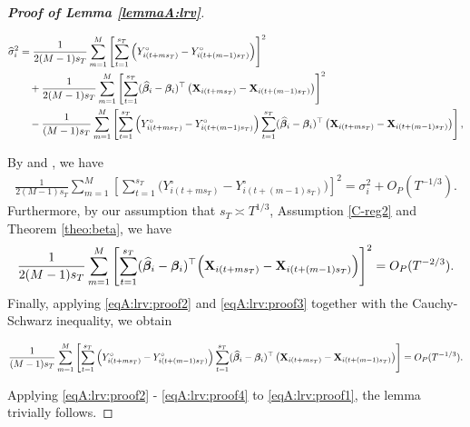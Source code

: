 \begin{proof}[\textnormal{\textbf{Proof of Lemma \ref{lemmaA:lrv}}}]
\begin{footnotesize}
\begin{align}\label{eqA:lrv:proof1}
\widehat{\sigma}_i^2  &= \frac{1}{2(M-1)s_T}\sum_{m=1}^M \left[\sum_{t = 1}^{s_T} \left(Y_{i(t + ms_T)}^\circ - Y_{i(t + (m-1)s_T)}^\circ\right)\right]^2 \nonumber\\
&\quad + \frac{1}{2(M-1)s_T}\sum_{m=1}^M \left[\sum_{t = 1}^{s_T} (\widehat{\bm{\beta}}_i - \bm{\beta}_i)^\top\left(\mathbf{X}_{i(t+ms_T)} - \mathbf{X}_{i(t+(m-1)s_T)}\right) \right]^2\\
 &\quad - \frac{1}{(M-1)s_T}\sum_{m=1}^M \left[\sum_{t = 1}^{s_T}  \left(Y_{i(t + ms_T)}^\circ - Y_{i(t + (m-1)s_T)}^\circ\right)\sum_{t = 1}^{s_T} (\widehat{\bm{\beta}}_i - \bm{\beta}_i)^\top\left(\mathbf{X}_{i(t+ms_T)} - \mathbf{X}_{i(t+(m-1)s_T)}\right) \right]\nonumber,
\end{align}
\end{footnotesize}
By \cite{Carlstein1986} and \cite{WuZhao2007}, we have
\begin{align}\label{eqA:lrv:proof2}
\frac{1}{2(M-1)s_T}\sum_{m=1}^M \left[\sum_{t = 1}^{s_T} \Big(Y_{i(t + ms_T)}^\circ - Y_{i(t + (m-1)s_T)}^\circ\Big)\right]^2  = \sigma_i^2 + O_P(T^{-1/3}).
\end{align}
Furthermore, by our assumption that $s_T \asymp T^{1/3}$, Assumption \ref{C-reg2} and Theorem \ref{theo:beta}, we have
\begin{align}\label{eqA:lrv:proof3}
\frac{1}{2(M-1)s_T}\sum_{m=1}^M \left[\sum_{t = 1}^{s_T} (\widehat{\bm{\beta}}_i - \bm{\beta}_i)^\top\Big(\mathbf{X}_{i(t+ms_T)} - \mathbf{X}_{i(t+(m-1)s_T)}\Big) \right]^2 = O_P(T^{-2/3}).
\end{align}
Finally, applying \eqref{eqA:lrv:proof2} and \eqref{eqA:lrv:proof3} together with the Cauchy-Schwarz inequality, we obtain
\begin{scriptsize}
\begin{align}\label{eqA:lrv:proof4}
\frac{1}{(M-1)s_T}\sum_{m=1}^M \left[\sum_{t = 1}^{s_T}  \left(Y_{i(t + ms_T)}^\circ - Y_{i(t + (m-1)s_T)}^\circ\right)\sum_{t = 1}^{s_T} (\widehat{\bm{\beta}}_i - \bm{\beta}_i)^\top\left(\mathbf{X}_{i(t+ms_T)} - \mathbf{X}_{i(t+(m-1)s_T)}\right) \right] = O_P(T^{-1/3}).
\end{align}
\end{scriptsize}

Applying \eqref{eqA:lrv:proof2} - \eqref{eqA:lrv:proof4} to \eqref{eqA:lrv:proof1}, the lemma trivially follows.
\end{proof}


